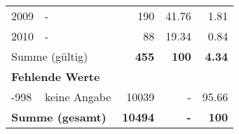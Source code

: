 \begin{longtable}{lXrrr}
     2009 &
     \multicolumn{1}{X}{ -  } &


       \num{190} &
       \num[round-mode=places,round-precision=2]{41,76} &
         \num[round-mode=places,round-precision=2]{1,81} \\

     2010 &
     \multicolumn{1}{X}{ -  } &


       \num{88} &
       \num[round-mode=places,round-precision=2]{19,34} &
         \num[round-mode=places,round-precision=2]{0,84} \\
     \midrule
     \multicolumn{2}{l}{Summe (gültig)} &
       \textbf{\num{455}} &
     \textbf{100} &
       \textbf{\num[round-mode=places,round-precision=2]{4,34}} \\
     \multicolumn{5}{l}{\textbf{Fehlende Werte}}\\
       -998 &
       keine Angabe &
         \num{10039} &
        - &
         \num[round-mode=places,round-precision=2]{95,66} \\
     \midrule
     \multicolumn{2}{l}{\textbf{Summe (gesamt)}} &
          \textbf{\num{10494}} &
        \textbf{-} &
        \textbf{100} \\
     \bottomrule
     \end{longtable}
     
